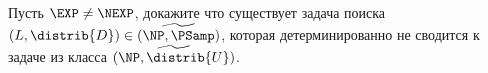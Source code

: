 Пусть $\EXP \neq \NEXP$, докажите что существует задача поиска
$(L, \distrib{D}) \in \widetilde{(\NP, \PSamp)}$, которая детерминированно не сводится к
задаче из класса $\widetilde{(\NP, \distrib{U})}$.
